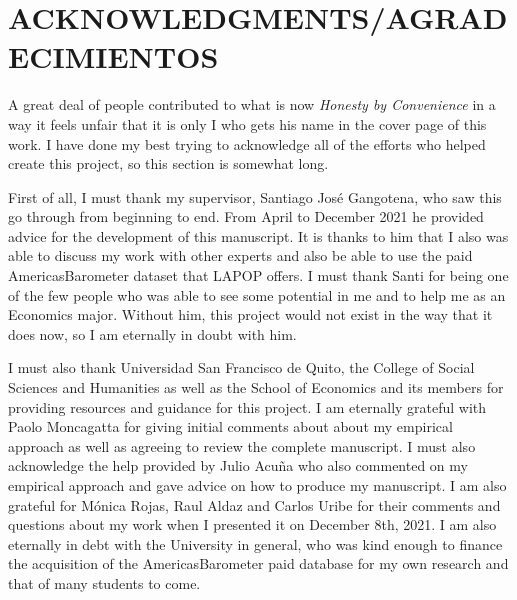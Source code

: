 \documentclass[12pt,a4]{article}\usepackage[]{graphicx}\usepackage[]{xcolor}
\begin{document}



\section*{ACKNOWLEDGMENTS/AGRADECIMIENTOS}

A great deal of people contributed to what is now \textit{Honesty by Convenience} in a way it feels unfair that it is only I who gets his name in the cover page of this work. I have done my best trying to acknowledge all of the efforts who helped create this project, so this section is somewhat long. 

First of all, I must thank my supervisor, Santiago José Gangotena, who saw this go through from beginning to end. From April to December 2021 he provided advice for the development of this manuscript. It is thanks to him that I also was able to discuss my work with other experts and also be able to use the paid AmericasBarometer dataset that LAPOP offers. I must thank Santi for being one of the few people who was able to see some potential in me and to help me as an Economics major. Without him, this project would not exist in the way that it does now, so I am eternally in doubt with him. 

I must also thank Universidad San Francisco de Quito, the College of Social Sciences and Humanities as well as the School of Economics and its members for providing resources and guidance for this project. I am eternally grateful with Paolo Moncagatta for giving initial comments about about my empirical approach as well as agreeing to review the complete manuscript. I must also acknowledge the help provided by Julio Acuña who also commented on my empirical approach and gave advice on how to produce my manuscript. I am also grateful for Mónica Rojas, Raul Aldaz and Carlos Uribe for their comments and questions about my work when I presented it on December 8th, 2021. I am also eternally in debt with the University in general, who was kind enough to finance the acquisition of the AmericasBarometer paid database for my own research and that of many students to come. 
\end{document}
